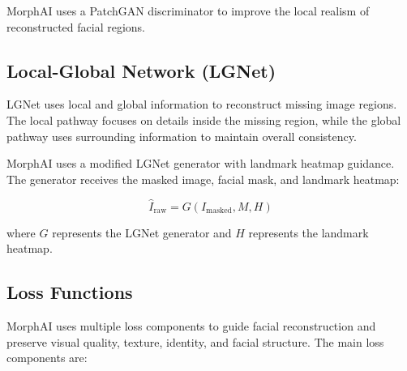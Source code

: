 \noindent MorphAI uses a PatchGAN discriminator to improve the local realism of reconstructed facial regions.

\subsection{Local-Global Network (LGNet)}

LGNet uses local and global information to reconstruct missing image regions. The local pathway focuses on details inside the missing region, while the global pathway uses surrounding information to maintain overall consistency.

\noindent MorphAI uses a modified LGNet generator with landmark heatmap guidance. The generator receives the masked image, facial mask, and landmark heatmap:

\begin{equation}
\hat{I}_{\text{raw}}
=
G(I_{\text{masked}},M,H)
\end{equation}

where $G$ represents the LGNet generator and $H$ represents the landmark heatmap.

\subsection{Loss Functions}

MorphAI uses multiple loss components to guide facial reconstruction and
preserve visual quality, texture, identity, and facial structure. The main
loss components are:

